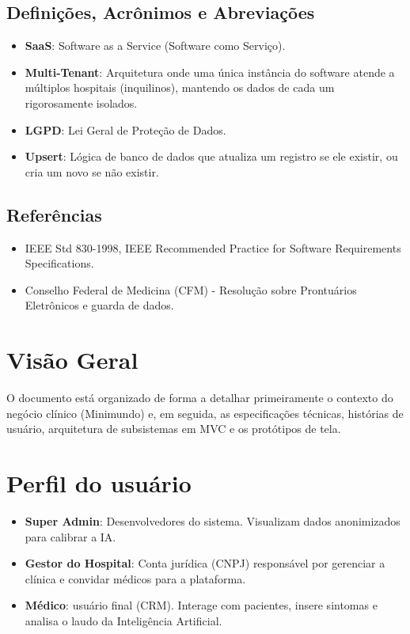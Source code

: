\documentclass{article}
\begin{document}
\subsection{Definições, Acrônimos e Abreviações}
\begin{itemize}
    \item \textbf{SaaS}: Software as a Service (Software como Serviço).
    \item \textbf{Multi-Tenant}: Arquitetura onde uma única instância do software atende a múltiplos hospitais (inquilinos), mantendo os dados de cada um rigorosamente isolados.
    \item \textbf{LGPD}: Lei Geral de Proteção de Dados.
    \item \textbf{Upsert}: Lógica de banco de dados que atualiza um registro se ele existir, ou cria um novo se não existir.
\end{itemize}

\subsection{Referências}
\begin{itemize}
    \item IEEE Std 830-1998, IEEE Recommended Practice for Software Requirements Specifications.
    \item Conselho Federal de Medicina (CFM) - Resolução sobre Prontuários Eletrônicos e guarda de dados.
\end{itemize}
\section{Visão Geral}
O documento está organizado de forma a detalhar primeiramente o contexto do negócio clínico (Minimundo) e, em seguida, as especificações técnicas, histórias de usuário, arquitetura de subsistemas em MVC e os protótipos de tela.

\section{Perfil do usuário}
\begin{itemize}
    \item \textbf{Super Admin}: Desenvolvedores do sistema. Visualizam dados anonimizados para calibrar a IA.
    \item \textbf{Gestor do Hospital}: Conta jurídica (CNPJ) responsável por gerenciar a clínica e convidar médicos para a plataforma.
    \item \textbf{Médico}: usuário final (CRM). Interage com pacientes, insere sintomas e analisa o laudo da Inteligência Artificial.
\end{itemize}
\end{document}
